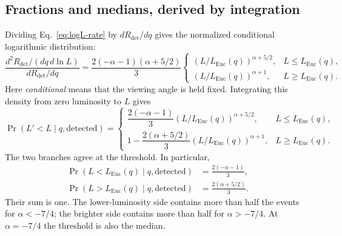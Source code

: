\documentclass[11pt,a4paper]{article}
\newcommand{\Euc}{\mathrm{Euc}}
\newcommand{\Rdet}{R_{\mathrm{det}}}
\begin{document}
\subsection{Fractions and medians, derived by integration}
Dividing Eq.~\eqref{eq:logL-rate} by $d\Rdet/dq$ gives the normalized
conditional logarithmic distribution:
\begin{equation}
 \frac{d^2\Rdet/(dq\,d\ln L)}{d\Rdet/dq}
 =\frac{2(-\alpha-1)(\alpha+5/2)}{3}
 \begin{cases}
 (L/L_\Euc(q))^{\alpha+5/2},&L\le L_\Euc(q),\\
 (L/L_\Euc(q))^{\alpha+1},&L\ge L_\Euc(q).
 \end{cases}
 \label{eq:conditional-density}
\end{equation}
Here \emph{conditional} means that the viewing angle is held fixed. Integrating
this density from zero luminosity to $L$ gives
\begin{equation}
 \Pr(L'<L\mid q,\mathrm{detected})=
 \begin{cases}
 \dfrac{2(-\alpha-1)}3
       (L/L_\Euc(q))^{\alpha+5/2},&L\le L_\Euc(q),\\[5pt]
 1-\dfrac{2(\alpha+5/2)}3
       (L/L_\Euc(q))^{\alpha+1},&L\ge L_\Euc(q).
 \end{cases}
 \label{eq:conditional-cdf}
\end{equation}
The two branches agree at the threshold. In particular,
\begin{align}
 \Pr(L<L_\Euc(q)\mid q,\mathrm{detected})&=\frac{2(-\alpha-1)}3,
 \label{eq:below-threshold}\\
 \Pr(L>L_\Euc(q)\mid q,\mathrm{detected})&=\frac{2(\alpha+5/2)}3.
 \label{eq:above-threshold}
\end{align}
Their sum is one. The lower-luminosity side contains more than half the
events for $\alpha<-7/4$; the brighter side contains more than half for
$\alpha>-7/4$. At $\alpha=-7/4$ the threshold is also the median.
\end{document}
